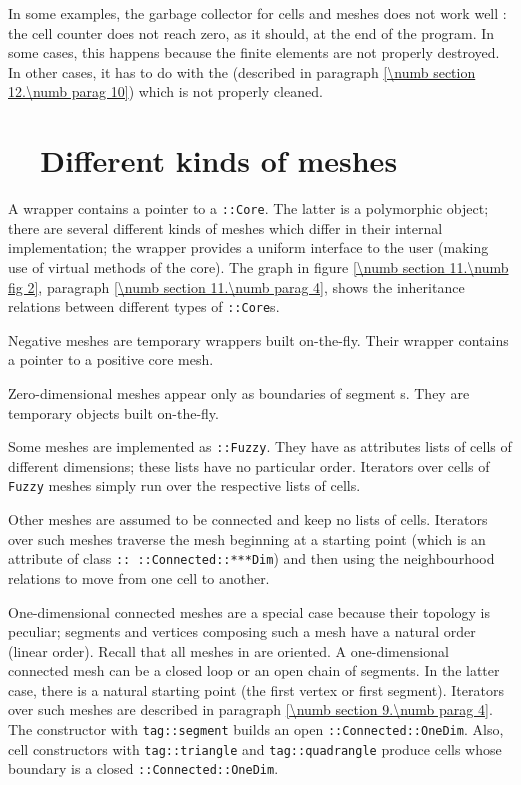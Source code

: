 In some examples, the garbage collector for cells and meshes does not work well :
the cell counter does not reach zero, as it should, at the end of the program.
In some cases, this happens because the finite elements are not properly destroyed.
In other cases, it has to do with the {\small\tt{}} (described in
paragraph \ref{\numb section 12.\numb parag 10}) which is not properly cleaned.


\section{~~Different kinds of meshes}\label{\numb section 11.\numb parag 6}

A {\small\tt{}} wrapper contains a pointer to a {\small\tt{}::Core}.
The latter is a polymorphic object; there are several different kinds of meshes
which differ in their internal implementation; the wrapper provides a uniform interface
to the user (making use of virtual methods of the core).
The graph in figure \ref{\numb section 11.\numb fig 2}, paragraph
\ref{\numb section 11.\numb parag 4}, shows the inheritance relations between different types
of {\small\tt{}::Core}s.

Negative meshes are temporary wrappers built on-the-fly.
Their wrapper contains a pointer to a positive core mesh.

Zero-dimensional meshes appear only as boundaries of segment {\small\tt{}}s.
They are temporary objects built on-the-fly.

Some meshes are implemented as {\small\tt{}::Fuzzy}.
They have as attributes lists of cells of different dimensions;
these lists have no particular order.
Iterators over cells of {\small\tt Fuzzy} meshes simply run over the respective lists of cells.

Other meshes are assumed to be connected and keep no lists of cells.
Iterators over such meshes traverse the mesh beginning at a starting point (which is an attribute
of class {\small\tt{}:: ::Connected::***Dim}) and then using the neighbourhood relations
to move from one cell to another.

One-dimensional connected meshes are a special case because their topology is peculiar;
segments and vertices composing such a mesh have a natural order (linear order).
Recall that all meshes in {\maniFEM} are oriented.
A one-dimensional connected mesh can be a closed loop or an open chain of segments.
In the latter case, there is a natural starting point (the first vertex or first segment).
Iterators over such meshes are described in paragraph \ref{\numb section 9.\numb parag 4}.
The {\small\tt{}} constructor with {\small\tt \textcolor{tag}{tag}::segment}
builds an open {\small\tt{}::Connected::OneDim}.
Also, cell constructors with {\small\tt \textcolor{tag}{tag}::triangle} and
{\small\tt \textcolor{tag}{tag}::quadrangle} produce cells
whose boundary is a closed {\small\tt{}::Connected::OneDim}.

